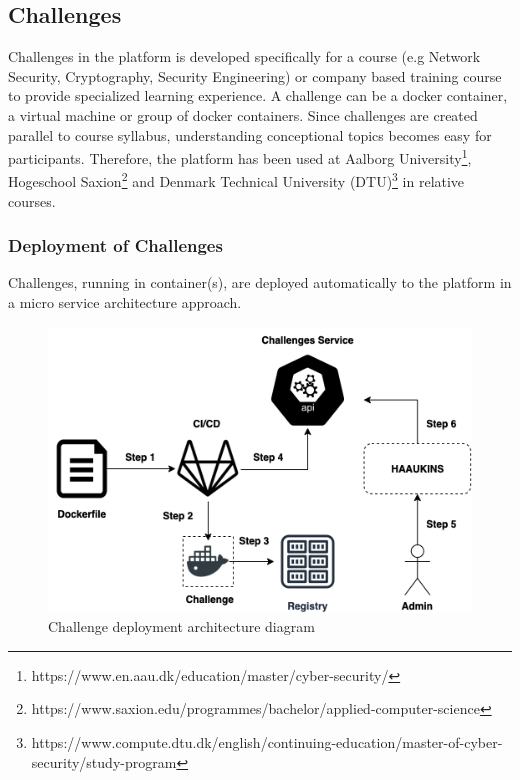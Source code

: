 \subsection{Challenges}

Challenges in the platform is developed specifically for a course (e.g Network Security, Cryptography, Security Engineering) or company based training course to provide specialized learning experience. A challenge can be a docker container, a virtual machine or group of docker containers. Since challenges are created parallel to course syllabus, understanding conceptional topics becomes easy for participants. Therefore, the platform has been used at Aalborg University\footnote{https://www.en.aau.dk/education/master/cyber-security/},  Hogeschool Saxion\footnote{https://www.saxion.edu/programmes/bachelor/applied-computer-science} and Denmark Technical University (DTU)\footnote{https://www.compute.dtu.dk/english/continuing-education/master-of-cyber-security/study-program} in relative courses. 

\subsubsection{Deployment of Challenges}

Challenges, running in container(s), are deployed automatically to the platform in a micro service architecture approach. 

\begin{figure}[htbp]
\centerline{\includegraphics[scale=.6]{figures/challenge-deployment.png}}
\caption{Challenge deployment architecture diagram}
\label{fig}
\end{figure}

